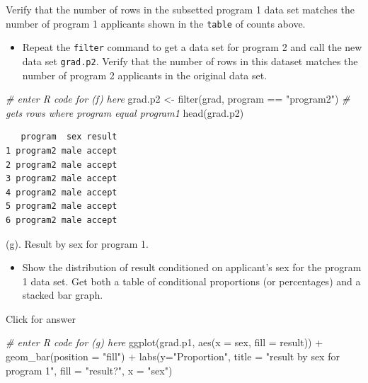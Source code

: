 \documentclass[
]{book}
\newenvironment{Shaded}{\begin{snugshade}}{\end{snugshade}}
\newcommand{\AttributeTok}[1]{\textcolor[rgb]{0.77,0.63,0.00}{#1}}
\newcommand{\CommentTok}[1]{\textcolor[rgb]{0.56,0.35,0.01}{\textit{#1}}}
\newcommand{\FunctionTok}[1]{\textcolor[rgb]{0.00,0.00,0.00}{#1}}
\newcommand{\NormalTok}[1]{#1}
\newcommand{\OtherTok}[1]{\textcolor[rgb]{0.56,0.35,0.01}{#1}}
\newcommand{\SpecialCharTok}[1]{\textcolor[rgb]{0.00,0.00,0.00}{#1}}
\newcommand{\StringTok}[1]{\textcolor[rgb]{0.31,0.60,0.02}{#1}}
\providecommand{\tightlist}{%
  \setlength{\itemsep}{0pt}\setlength{\parskip}{0pt}}
\begin{document}
Verify that the number of rows in the subsetted program 1 data set matches the number of program 1 applicants shown in the \texttt{table} of counts above.

\begin{itemize}
\tightlist
\item
  Repeat the \texttt{filter} command to get a data set for program 2 and call the new data set \texttt{grad.p2}. Verify that the number of rows in this dataset matches the number of program 2 applicants in the original data set.
\end{itemize}

\begin{Shaded}
\begin{Highlighting}[]
\CommentTok{\# enter R code for (f) here}
\NormalTok{grad.p2 }\OtherTok{\textless{}{-}} \FunctionTok{filter}\NormalTok{(grad, program }\SpecialCharTok{==} \StringTok{"program2"}\NormalTok{) }\CommentTok{\# gets rows where program equal program1}
\FunctionTok{head}\NormalTok{(grad.p2)}
\end{Highlighting}
\end{Shaded}

\begin{verbatim}
   program  sex result
1 program2 male accept
2 program2 male accept
3 program2 male accept
4 program2 male accept
5 program2 male accept
6 program2 male accept
\end{verbatim}

(g). Result by sex for program 1.

\begin{itemize}
\tightlist
\item
  Show the distribution of result conditioned on applicant's sex for the program 1 data set. Get both a table of conditional proportions (or percentages) and a stacked bar graph.
\end{itemize}

Click for answer

\begin{Shaded}
\begin{Highlighting}[]
\CommentTok{\# enter R code for (g) here}
\FunctionTok{ggplot}\NormalTok{(grad.p1, }\FunctionTok{aes}\NormalTok{(}\AttributeTok{x =}\NormalTok{ sex, }\AttributeTok{fill =}\NormalTok{ result)) }\SpecialCharTok{+}
 \FunctionTok{geom\_bar}\NormalTok{(}\AttributeTok{position =} \StringTok{"fill"}\NormalTok{) }\SpecialCharTok{+}
 \FunctionTok{labs}\NormalTok{(}\AttributeTok{y=}\StringTok{"Proportion"}\NormalTok{, }\AttributeTok{title =} \StringTok{"result by sex for program 1"}\NormalTok{,}
 \AttributeTok{fill =} \StringTok{"result?"}\NormalTok{, }\AttributeTok{x =} \StringTok{"sex"}\NormalTok{)}
\end{Highlighting}
\end{Shaded}
\end{document}
